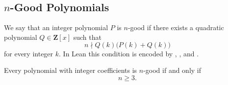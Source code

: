 
\subsection{\(n\)-Good Polynomials}

We say that an integer polynomial \(P\) is \(n\)-good if there exists a quadratic
polynomial \(Q\in\mathbf Z[x]\) such that
\[
  n \nmid Q(k)\bigl(P(k)+Q(k)\bigr)
\]
for every integer \(k\). In Lean this condition is encoded by
,
, and
.

\begin{theorem}
Every polynomial with integer coefficients is \(n\)-good if and only if
\[
  n \ge 3.
\]
\end{theorem}


